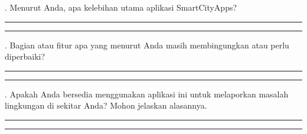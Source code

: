 . Menurut Anda, apa kelebihan utama aplikasi SmartCityApps?

\vspace{0.2cm}
\noindent \rule{\linewidth}{0.4pt}
\vspace{0.2cm}
\noindent \rule{\linewidth}{0.4pt}

\vspace{0.4cm}
. Bagian atau fitur apa yang menurut Anda masih membingungkan atau perlu diperbaiki?

\vspace{0.2cm}
\noindent \rule{\linewidth}{0.4pt}
\vspace{0.2cm}
\noindent \rule{\linewidth}{0.4pt}

\vspace{0.4cm}
. Apakah Anda bersedia menggunakan aplikasi ini untuk melaporkan masalah lingkungan di sekitar Anda? Mohon jelaskan alasannya.

\vspace{0.2cm}
\noindent \rule{\linewidth}{0.4pt}
\vspace{0.2cm}
\noindent \rule{\linewidth}{0.4pt}
